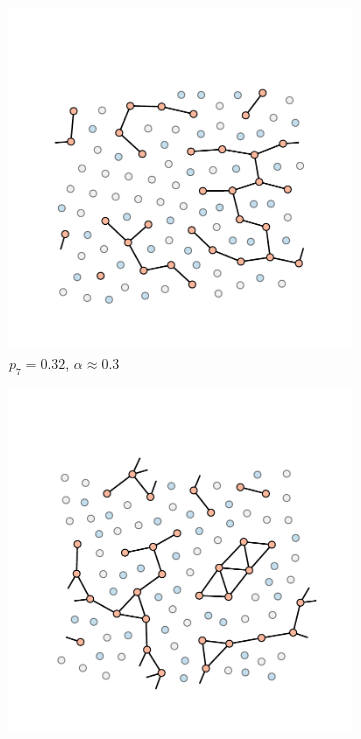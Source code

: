 \begin{figure}[bt]
     \begin{subfigure}[b]{0.3\textwidth}
         \centering
         \includegraphics[width=\textwidth]{./figures/targeted_opt/percolation_alpha_3.pdf}
         \caption{$p_7=0.32$, $\alpha\approx0.3$}
         \label{fig:percalphaa}
     \end{subfigure}
     \hfill
      \begin{subfigure}[b]{0.3\textwidth}
         \centering
         \includegraphics[width=\textwidth]{./figures/targeted_opt/percolation_alpha_1.pdf}

\end{subfigure}
\end{figure}
